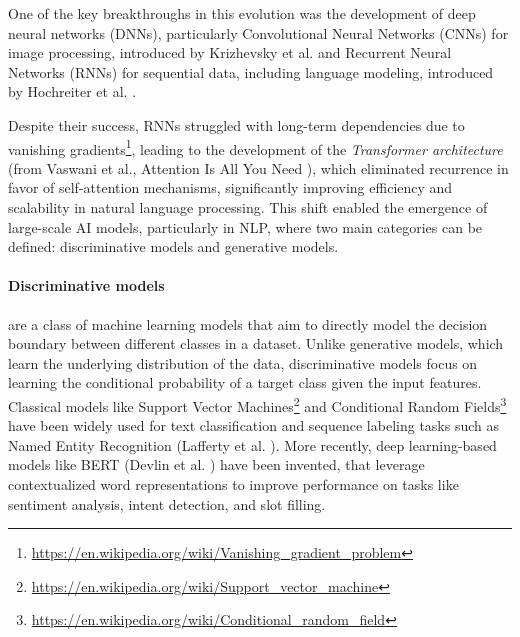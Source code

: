 One of the key breakthroughs in this evolution was the development of deep neural
networks (DNNs), particularly Convolutional Neural Networks (CNNs) for image
processing, introduced by Krizhevsky et al. \cite{articleCNN} and Recurrent
Neural Networks (RNNs) for sequential data, including language modeling,
introduced by Hochreiter et al. \cite{articleRNN}.

Despite their success, RNNs struggled with long-term dependencies due to
vanishing gradients\footnote{\url{https://en.wikipedia.org/wiki/Vanishing_gradient_problem}},
leading to the development of the \emph{Transformer architecture} (from Vaswani
et al., Attention Is All You Need \cite{vaswani2023attentionneed}), which
eliminated recurrence in favor of self-attention mechanisms, significantly improving
efficiency and scalability in natural language processing. This shift enabled
the emergence of large-scale AI models, particularly in NLP, where two main
categories can be defined: discriminative models and generative models.

\paragraph{Discriminative models}
are a class of machine learning models that aim to directly model the decision
boundary between different classes in a dataset. Unlike generative models, which
learn the underlying distribution of the data, discriminative models focus on learning
the conditional probability of a target class given the input features.
Classical models like Support Vector Machines\footnote{\url{https://en.wikipedia.org/wiki/Support_vector_machine}}
and Conditional Random Fields\footnote{\url{https://en.wikipedia.org/wiki/Conditional_random_field}}
have been widely used for text classification and sequence labeling tasks such
as Named Entity Recognition (Lafferty et al. \cite{crf}). More recently, deep learning-based
models like BERT (Devlin et al. \cite{devlin2019bertpretrainingdeepbidirectional})
have been invented, that leverage contextualized word representations to improve
performance on tasks like sentiment analysis, intent detection, and slot filling.

